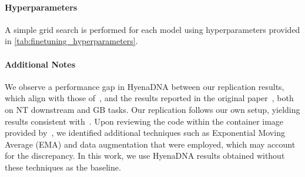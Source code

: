 \paragraph{Hyperparameters} 
A simple grid search is performed for each model using hyperparameters provided in \cref{tab:finetuning_hyperparameters}.  
\begin{table}[ht]
\centering
\caption{Finetuning hyperparameters.}
\end{table}

\paragraph{Additional Notes}
We observe a performance gap in HyenaDNA between our replication results, which align with those of~\cite{schiff2024caduceus}, and the results reported in the original paper~\cite{nguyen2024hyenadna}, both on NT downstream and GB tasks. Our replication follows our own setup, yielding results consistent with~\cite{schiff2024caduceus}. Upon reviewing the code within the container image provided by~\cite{nguyen2024hyenadna}, we identified additional techniques such as Exponential Moving Average (EMA) and data augmentation that were employed, which may account for the discrepancy. In this work, we use HyenaDNA results obtained without these techniques as the baseline.